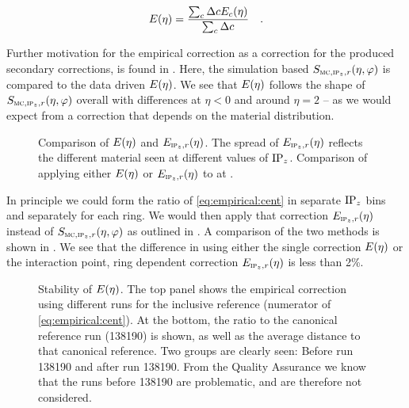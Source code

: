 \begin{equation}
  \label{eq:empirical}
  \EmpCor{} = \frac{\sum_c \Delta c\EmpCor[c]{}}{\sum_c \Delta c}\quad.
\end{equation}

Further motivation for the empirical correction as a correction
for the produced secondary corrections, is found in
.  Here, the simulation based $\SecMap$
is compared to the data driven $\EmpCor$.  We see that $\EmpCor$
follows the shape of $\SecMap$ overall with differences at $\eta<0$
and around $\eta=2$ -- as we would expect from a correction that
depends on the material distribution. 

\begin{figure}[h!tbp]
  \centering
  \caption{ Comparison of $\EmpCor$ and
    $\EmpCor[\subIPz,r]{}$.  The spread of $\EmpCor[\subIPz,r]{}$
    reflects the different material seen at different values of
    $\IPz$.    Comparison of applying
    either $\EmpCor$ or $\EmpCor[\subIPz,r]{}$ to \ppCol{} at
    . }
  \label{fig:empirical:methods}
\end{figure}

In principle we could form the ratio of \eqref{eq:empirical:cent} in
separate $\IPz$ bins and separately for each \FMD{} ring.  We would
then apply that correction $\EmpCor[\subIPz,r]{}$ instead of $\SecMap$
as outlined in .  A comparison of the two
methods is shown in .  We see that the
difference in using either the single correction $\EmpCor$ or the
interaction point, ring dependent correction $\EmpCor[\subIPz,r]{}$ is
less than 2\%.

\begin{figure}[h!tbp]
  \centering
  \caption{Stability of $\EmpCor$. The top panel shows the empirical
    correction using different runs for the inclusive reference
    (numerator of \eqref{eq:empirical:cent}). At the bottom, the ratio
    to the canonical reference run (138190) is shown, as well as the
    average distance to that canonical reference. Two groups are
    clearly seen: Before run 138190 and after run 138190.  From the
    Quality Assurance we know that the runs before 138190 are
    problematic, and are therefore not considered. }
  \label{fig:empirical:empcor_stable}
\end{figure}

